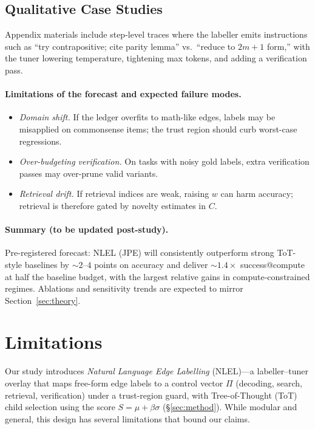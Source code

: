 \documentclass{article}
\theoremstyle{plain}
\theoremstyle{definition}
\theoremstyle{remark}
\begin{document}
\subsection{Qualitative Case Studies}

Appendix materials include step-level traces where the labeller emits instructions such as ``try contrapositive; cite parity lemma'' vs.\ ``reduce to $2m{+}1$ form,'' with the tuner lowering temperature, tightening max tokens, and adding a verification pass.

\paragraph{Limitations of the forecast and expected failure modes.}
\begin{itemize}\setlength{\itemsep}{2pt}
    \item \emph{Domain shift.} If the ledger overfits to math-like edges, labels may be misapplied on commonsense items; the trust region should curb worst-case regressions.
    \item \emph{Over-budgeting verification.} On tasks with noisy gold labels, extra verification passes may over-prune valid variants.
    \item \emph{Retrieval drift.} If retrieval indices are weak, raising $w$ can harm accuracy; retrieval is therefore gated by novelty estimates in $C$.
\end{itemize}

\paragraph{Summary (to be updated post-study).}
Pre-registered forecast: NLEL (JPE) will consistently outperform strong ToT-style baselines by $\sim2$--$4$ points on accuracy and deliver $\sim1.4\times$ success@compute at half the baseline budget, with the largest relative gains in compute-constrained regimes. Ablations and sensitivity trends are expected to mirror Section~\ref{sec:theory}.

\section{Limitations}

Our study introduces \emph{Natural Language Edge Labelling} (NLEL)---a labeller--tuner overlay that maps free-form edge labels to a control vector $\Pi$ (decoding, search, retrieval, verification) under a trust-region guard, with Tree-of-Thought (ToT) child selection using the score $S=\mu+\beta\sigma$ (\S\ref{sec:method}). While modular and general, this design has several limitations that bound our claims.
\end{document}
